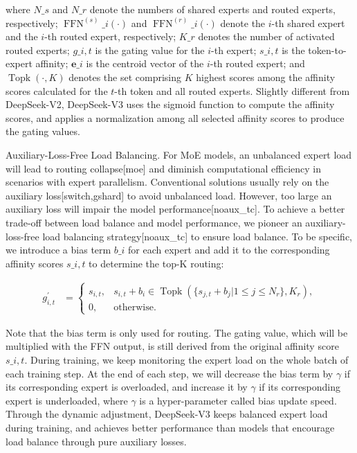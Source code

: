 \documentclass[11pt,a4paper]{article}
\begin{document}
where $N\_{s}$ and $N\_r$ denote the numbers of shared experts and routed experts, respectively; 
$\operatorname{FFN}^{(s)}\_{i}(\cdot)$ and $\operatorname{FFN}^{(r)}\_{i}(\cdot)$ denote the $i$-th shared expert and the $i$-th routed expert, respectively; 
$K\_{r}$ denotes the number of activated routed experts; 
$g\_{i,t}$ is the gating value for the $i$-th expert; 
$s\_{i,t}$ is the token-to-expert affinity; 
$\mathbf{e}\_{i}$ is the centroid vector of the $i$-th routed expert; 
and $\operatorname{Topk}(\cdot, K)$ denotes the set comprising $K$ highest scores among the affinity scores calculated for the $t$-th token and all routed experts.
Slightly different from DeepSeek-V2, DeepSeek-V3 uses the sigmoid function to compute the affinity scores, and applies a normalization among all selected affinity scores to produce the gating values.

Auxiliary-Loss-Free Load Balancing.
For MoE models, an unbalanced expert load will lead to routing collapse[moe] and diminish computational efficiency in scenarios with expert parallelism. 
Conventional solutions usually rely on the auxiliary loss[switch,gshard] to avoid unbalanced load. 
However, too large an auxiliary loss will impair the model performance[noaux\_tc]. 
To achieve a better trade-off between load balance and model performance, we pioneer an auxiliary-loss-free load balancing strategy[noaux\_tc] to ensure load balance. 
To be specific, we introduce a bias term $b\_i$ for each expert and add it to the corresponding affinity scores $s\_{i,t}$ to determine the top-K routing:

$$\begin{align}
    g^{\prime}_{i,t} & = \begin{cases} 
    s_{i,t}, & s_{i,t} + b_i \in \operatorname{Topk} (\{ s_{j, t} + b_j | 1 \leq j \leq N_r \}, K_{r}), \\
    0, & \text{otherwise}.
    \end{cases}
\end{align}$$

Note that the bias term is only used for routing.
The gating value, which will be multiplied with the FFN output, is still derived from the original affinity score $s\_{i,t}$.
During training, we keep monitoring the expert load on the whole batch of each training step.
At the end of each step, we will decrease the bias term by $\gamma$ if its corresponding expert is overloaded, and increase it by $\gamma$ if its corresponding expert is underloaded, where $\gamma$ is a hyper-parameter called bias update speed.
Through the dynamic adjustment, DeepSeek-V3 keeps balanced expert load during training, and achieves better performance than models that encourage load balance through pure auxiliary losses.
\end{document}
